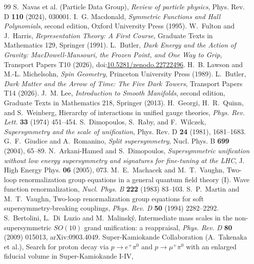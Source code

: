 \documentclass[11pt]{article}
\theoremstyle{definition}
\theoremstyle{plain}
\begin{document}
\begin{thebibliography}{99}
 S.~Navas et al. (Particle Data Group),
\emph{Review of particle physics},
Phys. Rev. D \textbf{110} (2024), 030001.
 I.~G. Macdonald,
\emph{Symmetric Functions and Hall Polynomials}, second edition,
Oxford University Press (1995).
 W.~Fulton and J.~Harris,
\emph{Representation Theory: A First Course},
Graduate Texts in Mathematics 129, Springer (1991).
 L.~Butler,
\emph{Dark Energy and the Action of Gravity: MacDowell-Mansouri, the Frozen Point, and One Way to Grip},
Transport Papers T10 (2026), doi:\href{https://doi.org/10.5281/zenodo.22722496}{10.5281/zenodo.22722496}.
 H.~B. Lawson and M.-L. Michelsohn,
\emph{Spin Geometry},
Princeton University Press (1989).
 L.~Butler,
\emph{Dark Matter and the Arrow of Time: The Five Dark Towers},
Transport Papers T14 (2026).
 J.~M. Lee,
\emph{Introduction to Smooth Manifolds}, second edition,
Graduate Texts in Mathematics 218, Springer (2013).
 H.~Georgi, H.~R.~Quinn, and S.~Weinberg,
Hierarchy of interactions in unified gauge theories,
\emph{Phys. Rev. Lett.} \textbf{33} (1974) 451--454.
 S.~Dimopoulos, S.~Raby, and F.~Wilczek,
\emph{Supersymmetry and the scale of unification},
Phys. Rev. D \textbf{24} (1981), 1681--1683.
 G.~F.~Giudice and A.~Romanino,
\emph{Split supersymmetry},
Nucl. Phys. B \textbf{699} (2004), 65--89.
 N.~Arkani-Hamed and S.~Dimopoulos,
\emph{Supersymmetric unification without low energy supersymmetry and signatures for fine-tuning at the LHC},
J. High Energy Phys. \textbf{06} (2005), 073.
 M.~E.~Machacek and M.~T.~Vaughn,
Two-loop renormalization group equations in a general quantum field theory (I). Wave function renormalization,
\emph{Nucl. Phys. B} \textbf{222} (1983) 83--103.
 S.~P.~Martin and M.~T.~Vaughn,
Two-loop renormalization group equations for soft supersymmetry-breaking couplings,
\emph{Phys. Rev. D} \textbf{50} (1994) 2282--2292.
 S.~Bertolini, L.~Di~Luzio and M.~Malinsk\'y,
Intermediate mass scales in the non-supersymmetric $SO(10)$ grand unification: a reappraisal,
\emph{Phys. Rev. D} \textbf{80} (2009) 015013, arXiv:0903.4049.
 Super-Kamiokande Collaboration (A.~Takenaka et al.),
Search for proton decay via $p \to e^{+}\pi^{0}$ and $p \to \mu^{+}\pi^{0}$ with an enlarged fiducial volume in Super-Kamiokande I-IV,

\end{thebibliography}
\end{document}
